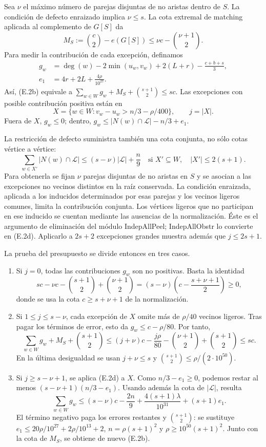 \documentclass[spanish,11pt,a4paper]{article}
\providecommand{\tightlist}{\setlength{\itemsep}{0pt}\setlength{\parskip}{0pt}}
\begin{document}
Sea \(\nu\) el máximo número de parejas disjuntas de no aristas dentro de \(S\). La condición de defecto enraizado implica \(\nu\le s\). La cota extremal de matching aplicada al complemento de \(G[S]\) da \[
M_S:=\binom c2-e(G[S])\le \nu c-\binom{\nu+1}2.
\] Para medir la contribución de cada excepción, definamos \[
\begin{split}
g_w&=\deg(w)-2\min(u_w,v_w)+2(L+r)-\frac{c+b+s}{3},\\
e_1&=4r+2L+\frac{4\rho}{10^{27}}.
\end{split}
\] Así, (E.2b) equivale a \(\sum_{w\in W}g_w+M_S+\binom{s+1}2\le sc\). Las excepciones con posible contribución positiva están en \[
X=\{w\in W:v_w-u_w>n/3-\rho/400\},\qquad j=|X|.
\] Fuera de \(X\), \(g_w\le0\); dentro, \(g_w\le |N(w)\cap\mathcal L|-n/3+e_1\).

La restricción de defecto suministra también una cota conjunta, no sólo cotas vértice a vértice: \[
\sum_{w\in X'}|N(w)\cap\mathcal L|
\le (s-\nu)|\mathcal L|+\frac n9
\quad\text{si }X'\subseteq W,\quad |X'|\le2(s+1).
\tag{E.2d}
\] Para obtenerla se fijan \(\nu\) parejas disjuntas de no aristas en \(S\) y se asocian a las excepciones no vecinos distintos en la raíz conservada. La condición enraizada, aplicada a los inducidos determinados por esas parejas y los vecinos ligeros comunes, limita la contribución conjunta. Los vértices ligeros que no participan en ese inducido se cuentan mediante las ausencias de la normalización. Éste es el argumento de eliminación del módulo IndepAllPeel; IndepAllObstr lo convierte en (E.2d). Aplicarlo a \(2s+2\) excepciones grandes muestra además que \(j\le2s+1\).


La prueba del presupuesto se divide entonces en tres casos.

\begin{enumerate}
\def\labelenumi{\arabic{enumi}.}
\tightlist
\item
  Si \(j=0\), todas las contribuciones \(g_w\) son no positivas. Basta la identidad \[
  sc-\nu c-\binom{s+1}2+\binom{\nu+1}2
  =(s-\nu)\left(c-\frac{s+\nu+1}{2}\right)\ge0,
  \] donde se usa la cota \(c\ge s+\nu+1\) de la normalización.
\item
  Si \(1\le j\le s-\nu\), cada excepción de \(X\) omite más de \(\rho/40\) vecinos ligeros. Tras pagar los términos de error, esto da \(g_w\le c-\rho/80\). Por tanto, \[
  \sum_{w\in W}g_w+M_S+\binom{s+1}2
  \le(j+\nu)c-\frac{j\rho}{80}
       -\binom{\nu+1}2+\binom{s+1}2\le sc.
  \] En la última desigualdad se usan \(j+\nu\le s\) y \(\binom{s+1}2\le\rho/(2\cdot10^{50})\).
\item
  Si \(j\ge s-\nu+1\), se aplica (E.2d) a \(X\). Como \(n/3-e_1\ge0\), podemos restar al menos \((s-\nu+1)(n/3-e_1)\). Usando además la cota de \(|\mathcal L|\), resulta \[
  \sum_{w\in W}g_w
  \le (s-\nu)c-\frac{2n}{9}
     +\frac{4(s+1)\lambda}{10^{31}}+(s+1)e_1.
  \] El término negativo paga los errores restantes y \(\binom{s+1}2\): se sustituye \(e_1\le20\rho/10^{27}+2\rho/10^{13}+2\), \(n=\rho(s+1)^2\) y \(\rho\ge10^{50}(s+1)^2\). Junto con la cota de \(M_S\), se obtiene de nuevo (E.2b).
\end{enumerate}
\end{document}
